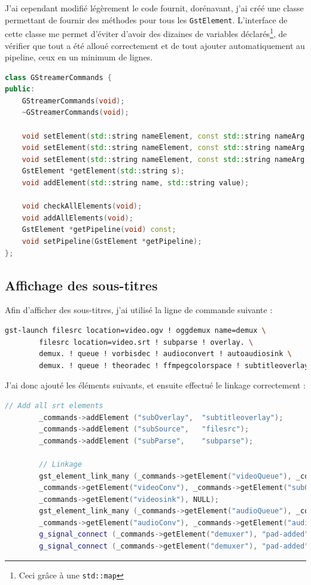 \documentclass[a4paper, 11pt]{article}
\begin{document}
	J'ai cependant modifié légèrement le code fournit, dorénavant, j'ai créé une classe permettant de fournir des méthodes pour tous les \texttt{GstElement}.
	L'interface de cette classe me permet d'éviter d'avoir des dizaines de variables déclarés\footnote{Ceci grâce à une \texttt{std::map}}, de vérifier que tout a été alloué correctement et de tout ajouter
	automatiquement au pipeline, ceux en un minimum de lignes.
	
	\begin{lstlisting}[language=C++, caption=Interface de gestion des commandes GStreamer]
class GStreamerCommands {
public:
	GStreamerCommands(void);
	~GStreamerCommands(void);

	void setElement(std::string nameElement, const std::string nameArg, const std::string valuePropertie);
	void setElement(std::string nameElement, const std::string nameArg, const double valuePropertie);
	void setElement(std::string nameElement, const std::string nameArg, const bool valuePropertie);
	GstElement *getElement(std::string s);
	void addElement(std::string name, std::string value);

	void checkAllElements(void);
	void addAllElements(void);
	GstElement *getPipeline(void) const;
	void setPipeline(GstElement *getPipeline);
};
	\end{lstlisting}
	\subsection{Affichage des sous-titres}
	Afin d'afficher des sous-titres, j'ai utilisé la ligne de commande suivante : 
	\begin{lstlisting}[language=sh]
		gst-launch filesrc location=video.ogv ! oggdemux name=demux \
		filesrc location=video.srt ! subparse ! overlay. \
		demux. ! queue ! vorbisdec ! audioconvert ! autoaudiosink \
		demux. ! queue ! theoradec ! ffmpegcolorspace ! subtitleoverlay name=overlay ! autovideosink;
	\end{lstlisting}

	J'ai donc ajouté les éléments suivants, et ensuite effectué le linkage correctement : 
	\begin{lstlisting}[language=C++]
		// Add all srt elements
		_commands->addElement ("subOverlay",  "subtitleoverlay");
		_commands->addElement ("subSource",   "filesrc");
		_commands->addElement ("subParse",    "subparse");

		// Linkage
		gst_element_link_many (_commands->getElement("videoQueue"), _commands->getElement("videoDecoder"),
		_commands->getElement("videoConv"), _commands->getElement("subOverlay"),
		_commands->getElement("videosink"), NULL);
		gst_element_link_many (_commands->getElement("audioQueue"), _commands->getElement("audioDecoder"),
		_commands->getElement("audioConv"), _commands->getElement("audiosink"), NULL);
		g_signal_connect (_commands->getElement("demuxer"), "pad-added", G_CALLBACK (on_pad_added), _commands->getElement("audioQueue"));
		g_signal_connect (_commands->getElement("demuxer"), "pad-added", G_CALLBACK (on_pad_added), _commands->getElement("videoQueue"));
	\end{lstlisting}
\end{document}
